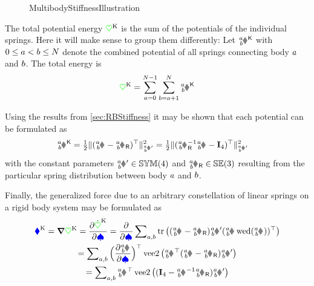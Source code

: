 \begin{figure}[ht]
 \centering
 
 \caption{MultibodyStiffnessIllustration}
 \label{fig:MultibodyStiffnessIllustration}
\end{figure}

The total potential energy $\textcolor{green}{\heartsuit}^{\mathrm{K}}$ is the sum of the potentials of the individual springs.
Here it will make sense to group them differently:
Let $\bodyPotentialStiff{\BidxI}{\BidxII}$ with $0 \leq a < b \leq N$ denote the combined potential of all springs connecting body $a$ and $b$.
The total energy is
\begin{align}
 \potentialStiff
 = \sum_{\BidxI=0}^{\numRigidBodies-1} \sum_{\BidxII=\BidxI+1}^{\numRigidBodies} \bodyPotentialStiff{\BidxI}{\BidxII}
\end{align}

Using the results from \autoref{sec:RBStiffness} it may be shown that each potential can be formulated as
\begin{align}
 \bodyPotentialStiff{\BidxI}{\BidxII} &= \tfrac{1}{2} \norm[\bodyStiffMatp{\BidxI}{\BidxII}]{(\bodyHomoCoord{\BidxI}{\BidxII} - \bodyHomoCoordR{\BidxI}{\BidxII})^\top}^2
 = \tfrac{1}{2} \norm[\bodyStiffMatp{\BidxI}{\BidxII}]{(\bodyHomoCoordR{\BidxI}{\BidxII}^{-1} \bodyHomoCoord{\BidxI}{\BidxII} - \idMat[4])^\top}^2
\end{align}
with the constant parameters $\bodyStiffMatp{\BidxI}{\BidxII} \in \SymMat(4)$ and $\bodyHomoCoordR{\BidxI}{\BidxII}\in \SpecialEuclideanGroup(3)$ resulting from the particular spring distribution between body $a$ and $b$.

Finally, the generalized force due to an arbitrary constellation of linear springs on a rigid body system may be formulated as
\begin{multline}\label{eq:RBSGenForceStiff}
 \genForceStiff = \differential\potentialStiff
 = \frac{\partial \potentialStiffd}{\partial \sysVel}
 = \frac{\partial}{\partial \sysVel} \sumBodiesAB \tr\big((\bodyHomoCoord{\BidxI}{\BidxII} - \bodyHomoCoordR{\BidxI}{\BidxII}) \bodyStiffMatp{\BidxI}{\BidxII} (\bodyHomoCoord{\BidxI}{\BidxII} \wedOp(\bodyVel{\BidxI}{\BidxII}))^\top \big)
\\ 
 = \sumBodiesAB \Big(\frac{\partial \bodyVel{\BidxI}{\BidxII}}{\partial \sysVel}\Big)^\top \veeTwoOp\big(\bodyHomoCoord{\BidxI}{\BidxII}^\top (\bodyHomoCoord{\BidxI}{\BidxII} - \bodyHomoCoordR{\BidxI}{\BidxII}) \bodyStiffMatp{\BidxI}{\BidxII} \big)
\\
 = \sumBodiesAB \bodyJac{\BidxI}{\BidxII}^\top \veeTwoOp\big((\idMat[4] - \bodyHomoCoord{\BidxI}{\BidxII}^{-1} \bodyHomoCoordR{\BidxI}{\BidxII}) \bodyStiffMatp{\BidxI}{\BidxII} \big)
\end{multline}


